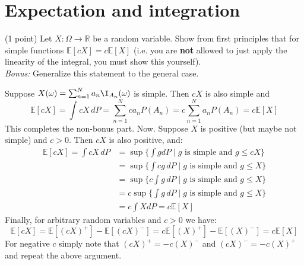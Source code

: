 \section{Expectation and integration}
(1 point) Let $X: \Omega \rightarrow \mathbb{R}$ be a random variable. Show from first principles that for simple functions $\mathbb{E}[cX] = c\mathbb{E}[X]$ (i.e. you are \textbf{not} allowed to just apply the linearity of the integral, you must show this yourself).\\
\emph{Bonus:} Generalize this statement to the general case.
\begin{gradedsolution}
    Suppose $X(\omega) = \sum_{n=1}^N a_n \I_{A_n}(\omega)$ is simple. Then $cX$ is also simple and
    \[
      \mathbb{E}[cX] = \int cX \,dP = \sum_{n=1}^N c a_n P(A_n) = c \sum_{n=1}^N a_n P(A_n) = c \mathbb{E}[X]
    \]
    This completes the non-bonus part. Now. Suppose $X$ is positive (but maybe not simple) and $c>0$. Then $cX$ is also positive, and:
    \begin{align*}
        \mathbb{E}[cX] = \int cX \,dP &= \sup \{ \int g dP \mid g \text{ is simple and } g \leq cX \} \\
        &=  \sup \{ \int cg \,dP \mid g \text{ is simple and } g \leq X \} \\
        &=  \sup \{c \int g \,dP \mid g \text{ is simple and } g \leq X \} \\
        &= c \sup \{\int g \,dP \mid g \text{ is simple and } g \leq X \} \\
        &= c \int X dP = c \mathbb{E}[X]
    \end{align*}
    Finally, for arbitrary random variables and $c>0$ we have:
    \[
      \mathbb{E}[cX] = \mathbb{E}[(cX)^+] - \mathbb{E}[(cX)^-] = c \mathbb{E}[(X)^+] - \mathbb{E}[(X)^-] = c \mathbb{E}[X]
      \]
    For negative $c$ simply note that $(cX)^+ = -c(X)^-$ and $(cX)^- = -c(X)^+$ and repeat the above argument.
\end{gradedsolution}

